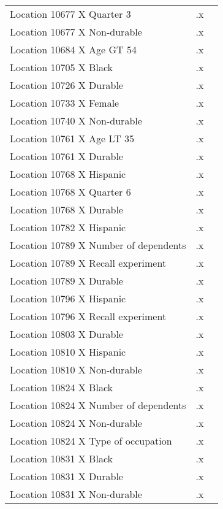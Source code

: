 \begin{tabular}{l*{2}{c}}
Location 10677 X Quarter 3&          .x&            \\
Location 10677 X Non-durable&          .x&            \\
Location 10684 X Age GT 54&          .x&            \\
Location 10705 X Black&          .x&            \\
Location 10726 X Durable&          .x&            \\
Location 10733 X Female&          .x&            \\
Location 10740 X Non-durable&          .x&            \\
Location 10761 X Age LT 35&          .x&            \\
Location 10761 X Durable&          .x&            \\
Location 10768 X Hispanic&          .x&            \\
Location 10768 X Quarter 6&          .x&            \\
Location 10768 X Durable&          .x&            \\
Location 10782 X Hispanic&          .x&            \\
Location 10789 X Number of dependents&          .x&            \\
Location 10789 X Recall experiment&          .x&            \\
Location 10789 X Durable&          .x&            \\
Location 10796 X Hispanic&          .x&            \\
Location 10796 X Recall experiment&          .x&            \\
Location 10803 X Durable&          .x&            \\
Location 10810 X Hispanic&          .x&            \\
Location 10810 X Non-durable&          .x&            \\
Location 10824 X Black&          .x&            \\
Location 10824 X Number of dependents&          .x&            \\
Location 10824 X Non-durable&          .x&            \\
Location 10824 X Type of occupation&          .x&            \\
Location 10831 X Black&          .x&            \\
Location 10831 X Durable&          .x&            \\
Location 10831 X Non-durable&          .x&            \\

\end{tabular}
